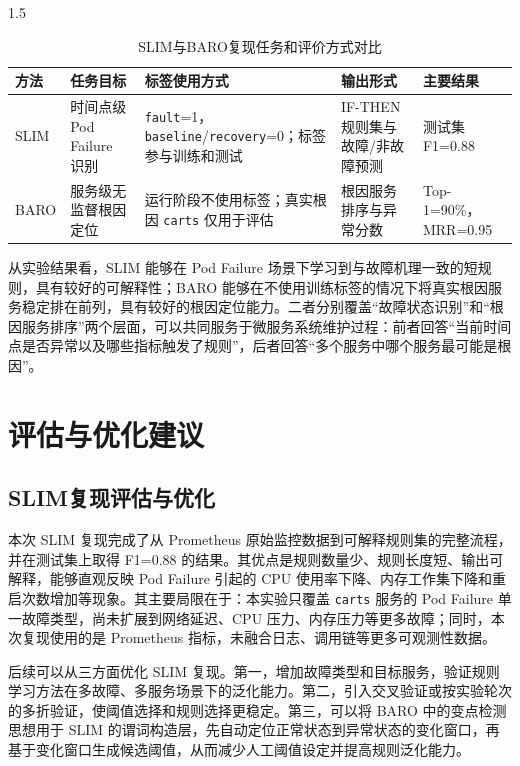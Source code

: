 \documentclass[a4paper,12pt]{report}
\begin{document}
\begin{spacing}{1.5}
\begin{table}[H]
\centering
\caption{SLIM与BARO复现任务和评价方式对比}
\begin{tabular}{p{2.2cm}p{3.2cm}p{3.1cm}p{3.8cm}p{2.4cm}}
\toprule
\textbf{方法} & \textbf{任务目标} & \textbf{标签使用方式} & \textbf{输出形式} & \textbf{主要结果} \\
\midrule
SLIM & 时间点级 Pod Failure 识别 & \texttt{fault}=1，\texttt{baseline}/\texttt{recovery}=0；标签参与训练和测试 & IF-THEN 规则集与故障/非故障预测 & 测试集 F1=0.88 \\
BARO & 服务级无监督根因定位 & 运行阶段不使用标签；真实根因 \texttt{carts} 仅用于评估 & 根因服务排序与异常分数 & Top-1=90\%，MRR=0.95 \\
\bottomrule
\end{tabular}
\end{table}

从实验结果看，SLIM 能够在 Pod Failure 场景下学习到与故障机理一致的短规则，具有较好的可解释性；BARO 能够在不使用训练标签的情况下将真实根因服务稳定排在前列，具有较好的根因定位能力。二者分别覆盖“故障状态识别”和“根因服务排序”两个层面，可以共同服务于微服务系统维护过程：前者回答“当前时间点是否异常以及哪些指标触发了规则”，后者回答“多个服务中哪个服务最可能是根因”。

\section{评估与优化建议}

\subsection{SLIM复现评估与优化}

本次 SLIM 复现完成了从 Prometheus 原始监控数据到可解释规则集的完整流程，并在测试集上取得 F1=0.88 的结果。其优点是规则数量少、规则长度短、输出可解释，能够直观反映 Pod Failure 引起的 CPU 使用率下降、内存工作集下降和重启次数增加等现象。其主要局限在于：本实验只覆盖 \texttt{carts} 服务的 Pod Failure 单一故障类型，尚未扩展到网络延迟、CPU 压力、内存压力等更多故障；同时，本次复现使用的是 Prometheus 指标，未融合日志、调用链等更多可观测性数据。

后续可以从三方面优化 SLIM 复现。第一，增加故障类型和目标服务，验证规则学习方法在多故障、多服务场景下的泛化能力。第二，引入交叉验证或按实验轮次的多折验证，使阈值选择和规则选择更稳定。第三，可以将 BARO 中的变点检测思想用于 SLIM 的谓词构造层，先自动定位正常状态到异常状态的变化窗口，再基于变化窗口生成候选阈值，从而减少人工阈值设定并提高规则泛化能力。


\end{spacing}
\end{document}
